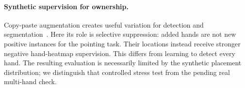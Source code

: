 \paragraph{Synthetic supervision for ownership.}
Copy-paste augmentation creates useful variation for detection and segmentation~\cite{dwibedi2017cut,ghiasi2021simple}. Here its role is selective suppression: added hands are not new positive instances for the pointing task. Their locations instead receive stronger negative hand-heatmap supervision. This differs from learning to detect every hand. The resulting evaluation is necessarily limited by the synthetic placement distribution; we distinguish that controlled stress test from the pending real multi-hand check.
